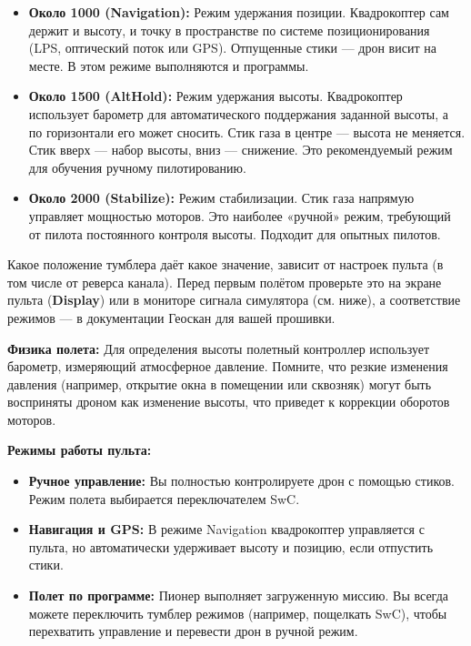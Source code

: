 \begin{itemize}
    \item \textbf{Около 1000 (Navigation):} Режим удержания позиции. Квадрокоптер сам держит и высоту, и точку в пространстве по системе позиционирования (LPS, оптический поток или GPS). Отпущенные стики --- дрон висит на месте. В этом режиме выполняются и программы.
    \item \textbf{Около 1500 (AltHold):} Режим удержания высоты. Квадрокоптер использует барометр для автоматического поддержания заданной высоты, а по горизонтали его может сносить. Стик газа в центре — высота не меняется. Стик вверх — набор высоты, вниз — снижение. Это рекомендуемый режим для обучения ручному пилотированию.
    \item \textbf{Около 2000 (Stabilize):} Режим стабилизации. Стик газа напрямую управляет мощностью моторов. Это наиболее «ручной» режим, требующий от пилота постоянного контроля высоты. Подходит для опытных пилотов.
\end{itemize}

Какое положение тумблера даёт какое значение, зависит от настроек пульта (в том числе от реверса канала). Перед первым полётом проверьте это на экране пульта (\textbf{Display}) или в мониторе сигнала симулятора (см. ниже), а соответствие режимов --- в документации Геоскан для вашей прошивки.

\begin{warnbox}
    \textbf{Физика полета:} Для определения высоты полетный контроллер использует барометр, измеряющий атмосферное давление. Помните, что резкие изменения давления (например, открытие окна в помещении или сквозняк) могут быть восприняты дроном как изменение высоты, что приведет к коррекции оборотов моторов.
\end{warnbox}

\textbf{Режимы работы пульта:}
\begin{itemize}
    \item \textbf{Ручное управление:} Вы полностью контролируете дрон с помощью стиков. Режим полета выбирается переключателем SwC.
    \item \textbf{Навигация и GPS:} В режиме Navigation квадрокоптер управляется с пульта, но автоматически удерживает высоту и позицию, если отпустить стики.
    \item \textbf{Полет по программе:} Пионер выполняет загруженную миссию. Вы всегда можете переключить тумблер режимов (например, пощелкать SwC), чтобы перехватить управление и перевести дрон в ручной режим.
\end{itemize}

